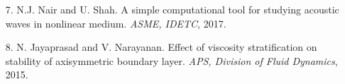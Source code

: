 \documentclass[margin]{res}
\begin{document}
\begin{resume}
\begin{itemize}
 \item[7.] N.J. Nair and U. Shah. A simple computational tool for studying acoustic waves in nonlinear medium. \textit{ASME, IDETC}, 2017.
 
 \item[8.] N. Jayaprasad and V. Narayanan. Effect of viscosity stratification on stability of axisymmetric boundary layer. \textit{APS, Division of Fluid Dynamics}, 2015.
  
\end{itemize}
		 
%
%
		 

\end{resume}
\end{document}
